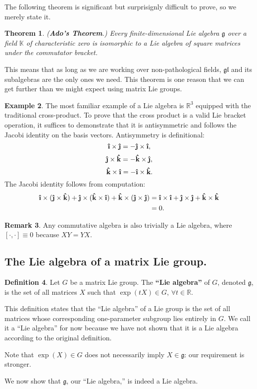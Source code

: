 \documentclass[12pt]{article}
\newcommand{\R}{\mathbb{R}}
\newcommand{\K}{\mathbb{K}}
\newcommand{\g}{\mathfrak{g}}
\newcommand{\gl}{\mathfrak{gl}}
\newcommand{\ihat}{\boldsymbol{\hat{\textbf{\i}}}}
\newcommand{\jhat}{\boldsymbol{\hat{\textbf{\j}}}}
\newcommand{\khat}{\boldsymbol{\hat{\textbf{k}}}}
\newtheorem{them}{Theorem}[section]
\theoremstyle{definition}
\theoremstyle{definition}
\theoremstyle{definition}
\theoremstyle{definition}
\newtheorem{rmk}[them]{Remark}
\theoremstyle{definition}
\newtheorem{defn}[them]{Definition}
\theoremstyle{definition}
\newtheorem{ex}[them]{Example}
\theoremstyle{definition}
\theoremstyle{definition}
\begin{document}
\par{The following theorem is significant but
surprisignly difficult to prove, so we merely
state it.}
\begin{them} (\textbf{Ado’s Theorem}.)
    Every finite-dimensional Lie algebra $\g$
    over a field $\K$ of characteristic zero is
    isomorphic to a Lie algebra of square matrices under
    the commutator bracket.
\end{them}
\par{This means that as long as we are working
over non-pathological fields, $\gl$ and its
subalgebras are the only ones we need. This
theorem is one reason that we can get further than
we might expect using matrix Lie groups.}

\begin{ex}
The most familiar example of a Lie algebra is
$\R^3$ equipped with the traditional
cross-product. To prove that the cross product is
a valid Lie bracket operation, it suffices to
demonstrate that it is antisymmetric and follows
the Jacobi identity on the basis vectors.
Antisymmetry is definitional:
\[\ihat \times \jhat = - \jhat \times \ihat,\]
\[\jhat \times \khat = - \khat \times \jhat,\]
\[\khat \times \ihat = - \ihat \times \khat.\] The
Jacobi identity follows from computation: 
\[\begin{aligned}
    \ihat \times (\jhat \times \khat) + \jhat
    \times (\khat \times \ihat) + \khat \times
    (\jhat \times \jhat)
    & = \ihat \times \ihat +
    \jhat \times \jhat + \khat \times \khat \\ & = 0.
\end{aligned}\]
\end{ex}
\begin{rmk}
Any commutative algebra is also trivially a Lie
algebra, where $[\cdot,\cdot] \equiv 0$ because
$XY = YX$.
\end{rmk}

\subsection{The Lie algebra of a matrix Lie group.}
\begin{defn} Let $G$ be a matrix Lie
group. The \textbf{“Lie algebra”} of $G$, denoted
$\g$, is the set of all matrices $X$
such that $\exp(tX) \in G$, $\forall t \in \R$.
\end{defn}

\par{This definition states that the “Lie algebra”
of a Lie group is the set of all matrices whose
corresponding one-parameter subgroup lies entirely
in $G$. We call it a “Lie algebra” for now because
we have not shown that it is a Lie algebra
according to the original definition.}
\par{Note that $\exp(X) \in G$ does not
necessarily imply $X \in \g$: our requirement is
stronger.}
\par{We now show that $\g$, our “Lie algebra,” is indeed a Lie algebra.}
\end{document}
